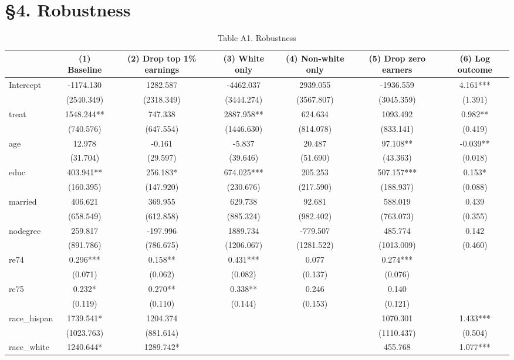 \section{§4. Robustness}

\begin{table}[htbp]
\centering
\caption{Table A1. Robustness}
\begin{tabular}{lcccccc}
\hline\hline
 & (1) Baseline & (2) Drop top 1\% earnings & (3) White only & (4) Non-white only & (5) Drop zero earners & (6) Log outcome \\
\hline
Intercept & -1174.130 & 1282.587 & -4462.037 & 2939.055 & -1936.559 & 4.161*** \\
 & (2540.349) & (2318.349) & (3444.274) & (3567.807) & (3045.359) & (1.391) \\
treat & 1548.244** & 747.338 & 2887.958** & 624.634 & 1093.492 & 0.982** \\
 & (740.576) & (647.554) & (1446.630) & (814.078) & (833.141) & (0.419) \\
age & 12.978 & -0.161 & -5.837 & 20.487 & 97.108** & -0.039** \\
 & (31.704) & (29.597) & (39.646) & (51.690) & (43.363) & (0.018) \\
educ & 403.941** & 256.183* & 674.025*** & 205.253 & 507.157*** & 0.153* \\
 & (160.395) & (147.920) & (230.676) & (217.590) & (188.937) & (0.088) \\
married & 406.621 & 369.955 & 629.738 & 92.681 & 588.019 & 0.439 \\
 & (658.549) & (612.858) & (885.324) & (982.402) & (763.073) & (0.355) \\
nodegree & 259.817 & -197.996 & 1889.734 & -779.507 & 485.774 & 0.142 \\
 & (891.786) & (786.675) & (1206.067) & (1281.522) & (1013.009) & (0.460) \\
re74 & 0.296*** & 0.158** & 0.431*** & 0.077 & 0.274*** &  \\
 & (0.071) & (0.062) & (0.082) & (0.137) & (0.076) &  \\
re75 & 0.232* & 0.270** & 0.338** & 0.246 & 0.140 &  \\
 & (0.119) & (0.110) & (0.144) & (0.153) & (0.121) &  \\
race\_hispan & 1739.541* & 1204.374 &  &  & 1070.301 & 1.433*** \\
 & (1023.763) & (881.614) &  &  & (1110.437) & (0.504) \\
race\_white & 1240.644* & 1289.742* &  &  & 455.768 & 1.077*** \\

\end{tabular}
\end{table}
